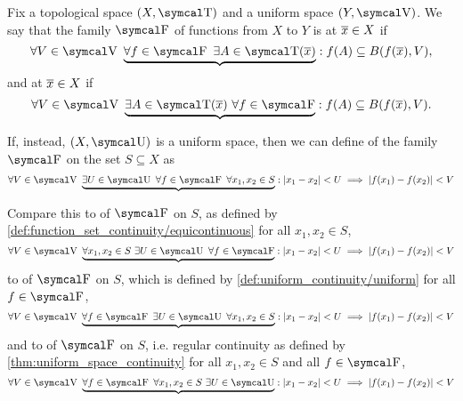 \begin{definition}\label{def:function_set_continuity}\cite[285]{Bouziad2004}
  Fix a topological space \( (X, \CT) \) and a uniform space \( (Y, \CV) \). We say that the family \( \CF \) of functions from \( X \) to \( Y \) is  at \( \overline{x} \in X \) if
  \begin{equation}\label{def:function_set_continuity/functionwise}
    \forall V \in \CV \ \underbrace{\forall f \in \CF \ \exists A \in \CT(\Ol{x})} : f(A) \subseteq B(f(\Ol{x}), V),
  \end{equation}
  and  at \( \overline{x} \in X \) if
  \begin{equation}\label{def:function_set_continuity/equicontinuous}
    \forall V \in \CV \ \underbrace{\exists A \in \CT(\Ol{x}) \ \forall f \in \CF} : f(A) \subseteq B(f(\Ol{x}), V).
  \end{equation}

  If, instead, \( (X, \CU) \) is a uniform space, then we can define  of the family \( \CF \) on the set \( S \subseteq X \) as
  \begin{equation}\label{def:function_set_continuity/uniform_equicontinuous}
    \forall V \in \CV \ \underbrace{\exists U \in \CU \ \forall f \in \CF \ \forall x_1, x_2 \in S} : \Abs{x_1 - x_2} < U \implies \Abs{f(x_1) - f(x_2)} < V
  \end{equation}

  Compare this to  of \( \CF \) on \( S \), as defined by \cref{def:function_set_continuity/equicontinuous} for all \( x_1, x_2 \in S \),
  \begin{equation}\label{def:function_set_continuity/pointwise_equicontinuous}
    \forall V \in \CV \ \underbrace{\forall x_1, x_2 \in S \ \exists U \in \CU \ \forall f \in \CF} : \Abs{x_1 - x_2} < U \implies \Abs{f(x_1) - f(x_2)} < V
  \end{equation}
  to  of \( \CF \) on \( S \), which is defined by \cref{def:uniform_continuity/uniform} for all \( f \in \CF \),
  \begin{equation}\label{def:function_set_continuity/uniform_functionwise}
    \forall V \in \CV \ \underbrace{\forall f \in \CF \ \exists U \in \CU \ \forall x_1, x_2 \in S} : \Abs{x_1 - x_2} < U \implies \Abs{f(x_1) - f(x_2)} < V
  \end{equation}
  and to  of \( \CF \) on \( S \), i.e. regular continuity as defined by \cref{thm:uniform_space_continuity} for all \( x_1, x_2 \in S \) and all \( f \in \CF \),
  \begin{equation}\label{def:function_set_continuity/functionwise_pointwise}
    \forall V \in \CV \ \underbrace{\forall f \in \CF \ \forall x_1, x_2 \in S \ \exists U \in \CU} : \Abs{x_1 - x_2} < U \implies \Abs{f(x_1) - f(x_2)} < V
  \end{equation}
\end{definition}

